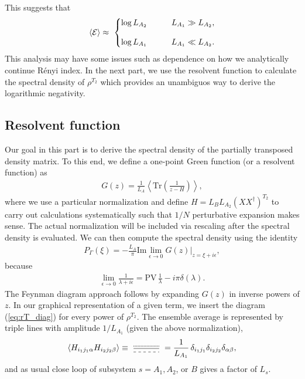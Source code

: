 \documentclass[aps,pra,groupedaddress,onecolumn,notitlepage,superscriptaddress,10pt]{revtex4-1}
\newcommand{\rT}{{\rho^{T_2}} }
\newcommand{\rTc}{{\rho^{T_2}} }
\newcommand{\Tr}{\text{Tr}}
\begin{document}
This suggests that
\begin{align}
    \braket{\cal E} \approx \ 
    \left\{
    \begin{matrix}
    \log L_{A_2} & \qquad  L_{A_1} \gg L_{A_2},
    \\
    \\
    \log L_{A_1} & \qquad  L_{A_1} \ll L_{A_2}.
    \end{matrix}
    \right.
\end{align}
This analysis may have some issues such as dependence on how we analytically continue R\'enyi index.
In the next part, we use the resolvent function to calculate the spectral density of $\rT$ which provides an unambiguos way to derive the logarithmic negativity.



\subsection{Resolvent function}

Our goal in this part is to derive the spectral density of the partially transposed density matrix.
To this end, we define a one-point Green function (or a resolvent function) as
\begin{align}
    G(z)=\frac{1}{L_A} \left\langle \Tr\left( \frac{1}{z-H}\right) \right\rangle,
\end{align}
where we use a particular normalization and define $H=L_B L_{A_2} (XX^\dag)^{T_2}$ to carry out calculations systematically such that $1/N$ perturbative expansion makes sense. 
The actual normalization will be included via rescaling after the spectral density is evaluated. We can then compute the spectral density using the identity
\begin{align}
    \label{eq:dos}
    P_\Gamma(\xi)= - \frac{L_A}{\pi} \text{Im} \lim_{\epsilon\to 0} G(z)\big|
    _{z=\xi + i\epsilon},
\end{align}
because
\begin{align}
    \lim_{\epsilon\to 0} \frac{1}{\lambda + i\epsilon} = \text{PV}\, \frac{1}{\lambda} - i \pi \delta(\lambda).
\end{align}
The Feynman diagram approach follows by expanding $G(z)$ in inverse powers of $z$. In our graphical representation of a given term, we insert the diagram (\ref{eq:rT_diag}) for every power of $\rTc$. 
The ensemble average is represented by triple lines with amplitude $1/L_{A_1}$ (given the above normalization),
\begin{align}
\braket{H_{i_1 j_1 \alpha} H_{i_2 j_2 \beta}} \equiv
\
\tikz[baseline=-0.8ex,scale=1]{
    \draw[densely dotted,thick] (0,0.05)--(1.1,0.05);
    \draw (0,-0.05)--(1.1,-0.05);
    \draw[dashed] (0,-0.2)--(1.1,-0.2);
    }
    \ 
    =\frac{1}{L_{A_1}}\, \delta_{i_1 j_1} \delta_{i_2 j_2} \delta_{\alpha\beta},
\end{align} 
and as usual close loop of subsystem $s=A_1,A_2$, or $B$ gives a factor of $L_s$.
\end{document}

